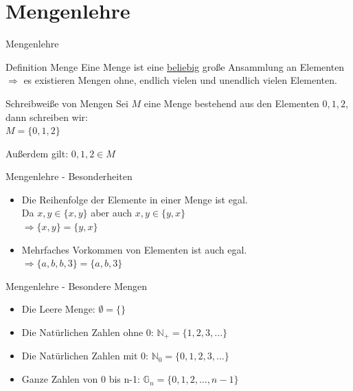 \documentclass[18pt]{beamer}
\begin{document}
\section{Mengenlehre}
	\begin{frame}{Mengenlehre}

		\begin{block} {Definition Menge}
			Eine Menge ist eine \underline{beliebig} gro\ss{}e Ansammlung an Elementen\\
			$\Rightarrow$ es existieren Mengen ohne, endlich vielen und unendlich vielen Elementen.
		\end{block}

		\begin{block}{Schreibwei\ss{}e von Mengen}
			Sei $M$ eine Menge bestehend aus den Elementen $0, 1, 2$, dann schreiben wir:\\
			\underline{$M = \{0, 1, 2\}$}
			\vspace{10pt}

			Au\ss{}erdem gilt: $0, 1, 2 \in M$

		\end{block}

	\end{frame}



	\begin{frame} {Mengenlehre - Besonderheiten}

		\begin{itemize}
			\item Die Reihenfolge der Elemente in einer Menge ist egal.\\
				Da $x,y \in \{x,y\}$ aber auch $x,y \in \{y,x\}$\\
				$\Rightarrow \{x,y\} = \{y,x\}$
			\pause
			\item Mehrfaches Vorkommen von Elementen ist auch egal.\\
				$\Rightarrow \{a, b, b, 3\} = \{a, b, 3\}$
	
		\end{itemize}
	\end{frame}


	\begin{frame} {Mengenlehre - Besondere Mengen}
		\begin{itemize}
			\item Die Leere Menge: $\emptyset = \{\}$
			\pause
			\item Die Nat\"urlichen Zahlen ohne 0: $\mathbb{N}_+ = \{1,2,3,...\}$
			\pause
			\item Die Nat\"urlichen Zahlen mit 0: $\mathbb{N}_0 = \{0,1,2,3,...\}$
			\pause
			\item Ganze Zahlen von 0 bis n-1: $\mathbb{G}_n = \{0,1,2,...,n-1\}$
		\end{itemize}
	\end{frame}
\end{document}
